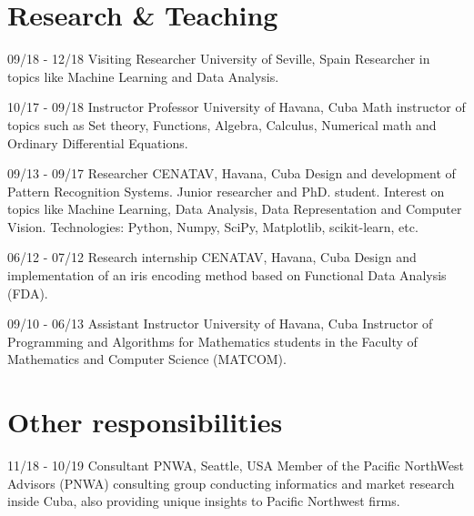 \documentclass[]{friggeri-cv}
\begin{document}
\section{Research \& Teaching}
\begin{entrylist}
  \entry
    {09/18 - 12/18}
    {Visiting Researcher}
    {University of Seville, Spain}
    {Researcher in topics like Machine Learning and Data Analysis.\\}

  \entry
    {10/17 - 09/18}
    {Instructor Professor}
    {University of Havana, Cuba}
    {Math instructor of topics such as Set theory, Functions, Algebra, Calculus, Numerical math and Ordinary Differential Equations.\\}

  \entry
    {09/13 - 09/17}
    {Researcher}
    {CENATAV, Havana, Cuba}
    {Design and development of Pattern Recognition Systems. Junior researcher and PhD. student. Interest on topics like Machine Learning, Data Analysis, Data Representation and Computer Vision. Technologies: Python, Numpy, SciPy, Matplotlib, scikit-learn, etc.\\}
\end{entrylist}

\begin{entrylist}
  \entry
    {06/12 - 07/12}
    {Research internship}
    {CENATAV, Havana, Cuba}
    {Design and implementation of an iris encoding method based on Functional Data Analysis (FDA).\\}
    
  \entry
    {09/10 - 06/13}
    {Assistant Instructor}
    {University of Havana, Cuba}
    {Instructor of Programming and Algorithms for Mathematics students in the Faculty of Mathematics and Computer Science (MATCOM).\\}
\end{entrylist}

\section{Other responsibilities}
\begin{entrylist}
  \entry
    {11/18 - 10/19}
    {Consultant}
    {PNWA, Seattle, USA}
    {Member of the Pacific NorthWest Advisors (PNWA) consulting group conducting informatics and market research inside Cuba, also providing unique insights to Pacific Northwest firms.}
\end{entrylist}
\end{document}
